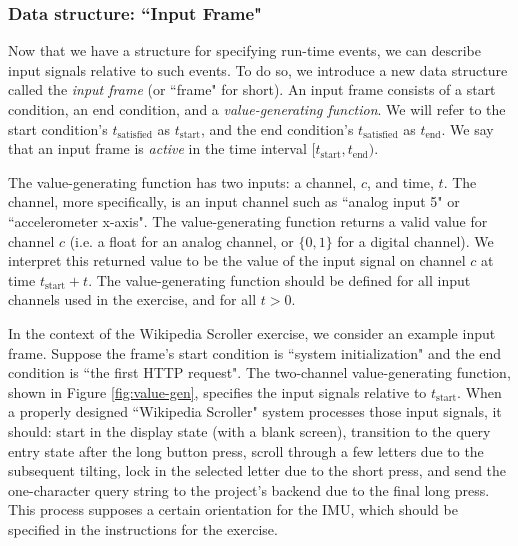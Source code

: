 \documentclass[12pt]{article}
\begin{document}
\subsubsection{Data structure: ``Input Frame"}
Now that we have a structure for specifying run-time events, we can describe input signals relative to such events.  To do so, we introduce a new data structure called the \textit{input frame} (or ``frame" for short).  An input frame consists of a start condition, an end condition, and a \textit{value-generating function}.  We will refer to the start condition's $t_{\text{satisfied}}$ as $t_{\text{start}}$, and the end condition's $t_{\text{satisfied}}$ as $t_{\text{end}}$.  We say that an input frame is \textit{active} in the time interval $[t_{\text{start}}, t_{\text{end}})$.

The value-generating function has two inputs: a channel, $c$, and time, $t$.  The channel, more specifically, is an input channel such as ``analog input 5" or ``accelerometer x-axis".  The value-generating function returns a valid value for channel $c$ (i.e. a float for an analog channel, or $\{0,1\}$ for a digital channel).  We interpret this returned value to be the value of the input signal on channel $c$ at time $t_{\text{start}}+t$.  The value-generating function should be defined for all input channels used in the exercise, and for all $t>0$.

In the context of the Wikipedia Scroller exercise, we consider an example input frame.  Suppose the frame's start condition is ``system initialization" and the end condition is ``the first HTTP request".  The two-channel value-generating function, shown in Figure \ref{fig:value-gen}, specifies the input signals relative to $t_{\text{start}}$.  When a properly designed ``Wikipedia Scroller" system processes those input signals, it should: start in the display state (with a blank screen), transition to the query entry state after the long button press, scroll through a few letters due to the subsequent tilting, lock in the selected letter due to the short press, and send the one-character query string to the project's backend due to the final long press.  This process supposes a certain orientation for the IMU, which should be specified in the instructions for the exercise.
\end{document}
